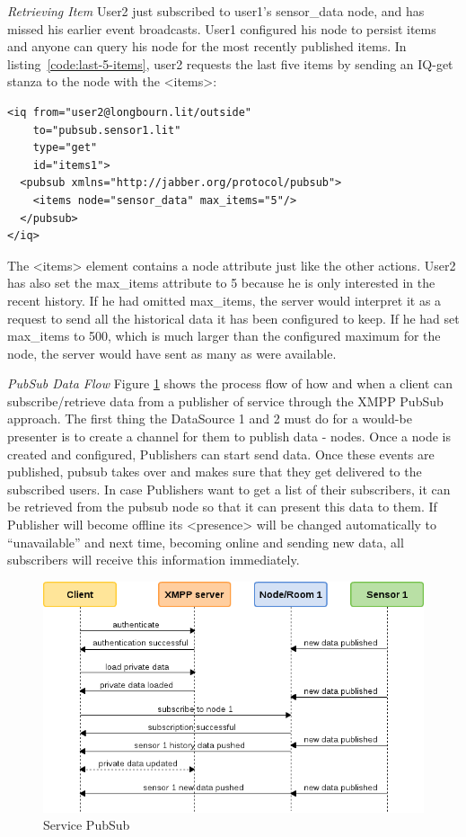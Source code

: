 \emph{Retrieving Item}
\newline
User2 just subscribed to user1's sensor\_data node, and has missed his earlier event broadcasts.  User1 configured his node to persist items and anyone can query his node for the most recently published items. In listing~\ref{code:last-5-items}, user2 requests the last five items by sending an IQ-get stanza to the node with the <items>:
\begin{lstlisting}[label=code:last-5-items,caption=PubSub: requesting last 5 items from history]
<iq from="user2@longbourn.lit/outside"
    to="pubsub.sensor1.lit"
    type="get"
    id="items1">
  <pubsub xmlns="http://jabber.org/protocol/pubsub">
    <items node="sensor_data" max_items="5"/>
  </pubsub>
</iq>
\end{lstlisting}
The <items> element contains a node attribute just like the other actions. User2 has also set the max\_items attribute to 5 because he is only interested in the recent history. If he had omitted max\_items, the server would interpret it as a request to send all the historical data it has been configured to keep. If he had set max\_items to 500, which is much larger than the configured maximum for the node, the server would have sent as many as were available.

\emph{PubSub Data Flow}
\newline
Figure \ref{img:pub_sub} shows the process flow of how and when a client can subscribe/retrieve data from a publisher of service through the XMPP PubSub approach. The first thing the DataSource 1 and 2 must do for a would-be presenter is to create a channel for them to publish data - nodes. Once a node is created and configured, Publishers can start send data. Once these events are published, pubsub takes over and makes sure that they get delivered to the subscribed users. In case Publishers want to get a list of their subscribers, it can be retrieved from the pubsub node so that it can present this data to them. If Publisher will become offline its <presence> will be changed automatically to ``unavailable'' and next time, becoming online and sending new data, all subscribers will receive this information immediately.
    \begin{figure}[!ht]
    \centering
    \includegraphics[scale=0.7]{images/PubSub.png}   
    \caption[Service PubSub]{Service PubSub}
    \label{img:pub_sub}                           
    \end{figure}
	    

